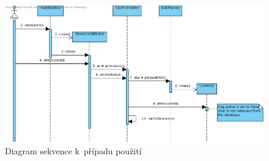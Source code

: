 \pagebreak

\begin{figure}[H]
	\begin{center}
		\includegraphics[width=13cm,keepaspectratio]{include/seq_delete_user}
	\end{center}
	\caption{Diagram sekvence k~případu použití }
	\label{fig:SeqRemoveEmployee}
\end{figure}


